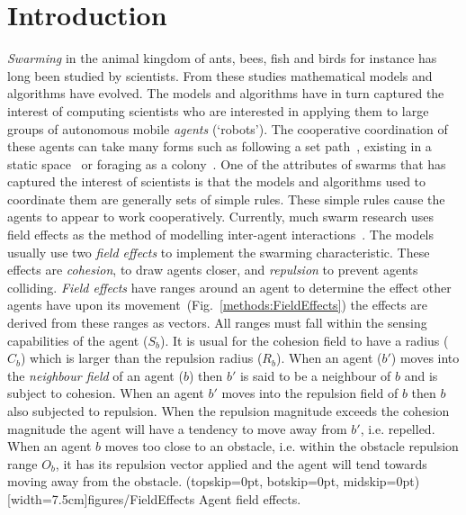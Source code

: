 \documentclass{ieeeaccess}
\begin{document}
\section{Introduction}\label{sec:ConcaveReduction}
\textit{Swarming} in the animal kingdom of ants, bees, fish and birds for instance has long been studied by scientists. From these studies mathematical models and algorithms have evolved. The models and algorithms have in turn captured the interest of computing scientists who are interested in applying them to large groups of autonomous mobile \textit{agents} (`robots'). The cooperative coordination of these agents can take many forms such as following a set path~\cite{HCS:09}, existing in a static space~\cite{EP:10, GP:02, GP:04} or foraging as a colony~\cite{HER:11, GK:07}. One of the attributes of swarms that has captured the interest of scientists is that the models and algorithms used to coordinate them are generally sets of simple rules. These simple rules cause the agents to appear to work cooperatively.
Currently, much swarm research uses field effects as the method of modelling inter-agent interactions~\cite{BAF:06, BAFVM:06, BM:09, APZDAMC:09, GP:02, GP:04, GP:04a, GP:05, GP:11, MYP:09}. The models usually use two \textit{field effects} to implement the swarming characteristic. These effects are \textit{cohesion}, to draw agents closer, and \textit{repulsion} to prevent agents colliding. \textit{Field effects} have ranges around an agent to determine the effect other agents have upon its movement~(Fig.~\ref{methods:FieldEffects}) the effects are derived from these ranges as vectors. All ranges must fall within the sensing capabilities of the agent ($S_b$). It is usual for the cohesion field to have a radius ($C_b$) which is larger than the repulsion radius ($R_b$). When an agent ($b'$) moves into the \textit{neighbour field} of an agent ($b$) then $b'$ is said to be a neighbour of $b$ and is subject to cohesion. When an agent $b'$ moves into the repulsion field of $b$ then $b$ also subjected to repulsion. When the repulsion magnitude exceeds the cohesion magnitude the agent will have a tendency to move away from $b'$, i.e. repelled. When an agent $b$ moves too close to an obstacle, i.e. within the obstacle repulsion range $O_b$, it has its repulsion vector applied and the agent will tend towards moving away from the obstacle.
\Figure[t!](topskip=0pt, botskip=0pt, midskip=0pt)[width=7.5cm]{figures/FieldEffects}
{Agent field effects.\label{methods:FieldEffects}}
\end{document}
